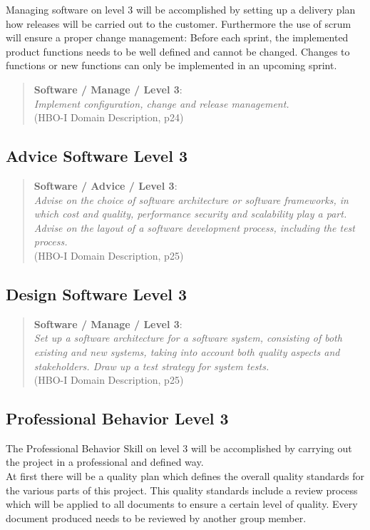 Managing software on level 3 will be accomplished by setting up a delivery plan how releases will be carried out to the customer. Furthermore the use of scrum will ensure a proper change management: Before each sprint, the implemented product functions needs to be well defined and cannot be changed. Changes to functions or new functions can only be implemented in an upcoming sprint.

\begin{quote}
	\textbf{Software / Manage / Level 3}: \\
	\textit{Implement configuration, change and release management.} \\
	(HBO-I Domain Description, p24)
\end{quote}


\subsection{Advice Software Level 3}
\begin{quote}
	\textbf{Software / Advice / Level 3}: \\
	\textit{
		Advise on the choice of software architecture or software frameworks, in which cost and quality, performance security and scalability play a part.
		Advise on the layout of a software development process, including the test process.
	} \\ (HBO-I Domain Description, p25)
\end{quote}

\subsection{Design Software Level 3}
\begin{quote}
	\textbf{Software / Manage / Level 3}: \\
	\textit{
		Set up a software architecture for a software system, consisting of both existing and new systems, taking into account both quality aspects and stakeholders. 
		Draw up a test strategy for system tests.
	} \\ (HBO-I Domain Description, p25)
\end{quote}


\subsection{Professional Behavior Level 3}

The Professional Behavior Skill on level 3 will be accomplished by carrying out the project in a professional and defined way. \\
At first there will be a quality plan which defines the overall quality standards for the various parts of this project.
This quality standards include a review process which will be applied to all documents to ensure a certain level of quality. 
Every document produced needs to be reviewed by another group member. \\

